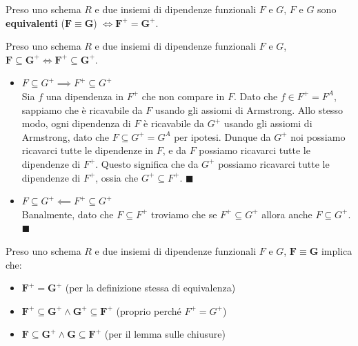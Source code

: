\documentclass[11pt, a4paper, titlepage, oneside]{scrbook}
\begin{document}
\begin{Definizione}
\label{def-insiemi-equivalenti}
Preso uno schema $R$ e due insiemi di dipendenze funzionali $F$ e $G$, $F$ e $G$ sono \textbf{equivalenti} ($\bm{F \equiv G}$) $\iff \bm{F^+ = G^+}$.
\end{Definizione}

\begin{Proposizione}
\label{propos-lemma-chiusure-insiemi}
Preso uno schema $R$ e due insiemi di dipendenze funzionali $F$ e $G$, $\bm{F \subseteq G^+} \iff \bm{F^+ \subseteq G^+}$.
\end{Proposizione}

\vspace{2cm}

\Dimostrazione \nopagebreak

\begin{itemize}
    \item $F \subseteq G^+ \implies F^+ \subseteq G^+$ \\
    Sia $f$ una dipendenza in $F^+$ che non compare in $F$. Dato che $f \in F^+ = F^A$, sappiamo che è ricavabile da $F$ usando gli assiomi di Armstrong. Allo stesso modo, ogni dipendenza di $F$ è ricavabile da $G^+$ usando gli assiomi di Armstrong, dato che $F \subseteq G^+ = G^A$ per ipotesi. Dunque da $G^+$ noi possiamo ricavarci tutte le dipendenze in $F$, e da $F$ possiamo ricavarci tutte le dipendenze di $F^+$. Questo significa che da $G^+$ possiamo ricavarci tutte le dipendenze di $F^+$, ossia che $G^+ \subseteq F^+$. $\blacksquare$ 
    \item $F \subseteq G^+ \impliedby F^+ \subseteq G^+$ \\
    Banalmente, dato che $F \subseteq F^+$ troviamo che se $F^+ \subseteq G^+$ allora anche $F \subseteq G^+$. $\blacksquare$
\end{itemize}

\begin{Proposizione}[Corollario]
\label{propos-corol-insiemi-equivlaenit}
Preso uno schema $R$ e due insiemi di dipendenze funzionali $F$ e $G$, $\bm{F \equiv G}$ implica che:
\begin{itemize}
    \item $\bm{F^+ = G^+}$ (per la definizione stessa di equivalenza)
    \item $\bm{F^+ \subseteq G^+} \land \bm{G^+ \subseteq F^+}$ (proprio perché $F^+ = G^+$)
    \item $\bm{F \subseteq G^+} \land \bm{G \subseteq F^+}$ (per il lemma sulle chiusure)
\end{itemize}
\end{Proposizione}
\end{document}
